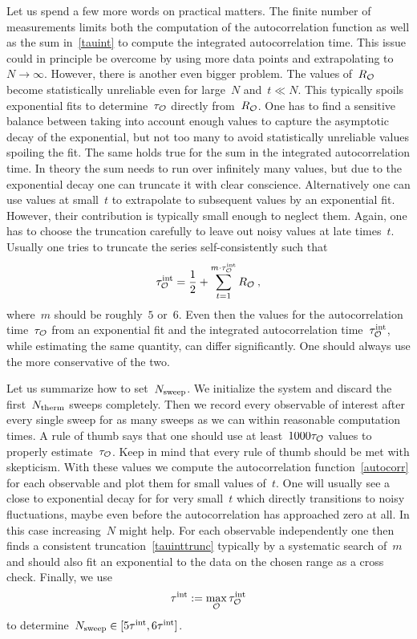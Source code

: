 Let us spend a few more words on practical matters. The finite number of
measurements limits both the computation of the autocorrelation function as well
as the sum in~\eqref{tauint} to compute the integrated autocorrelation time.
This issue could in principle be overcome by using more data points and
extrapolating to~$N\to \infty$. However, there is another even bigger problem.
The values of~$R_{\mathcal{O}}$ become statistically unreliable even for large~$N$
and~$t\ll N$. This typically spoils exponential fits to determine~$\tau_{\mathcal{O}}$
directly from~$R_{\mathcal{O}}$. One has to find a sensitive balance between taking into
account enough values to capture the asymptotic decay of the exponential, but
not too many to avoid statistically unreliable values spoiling the fit. The same
holds true for the sum in the integrated autocorrelation time. In theory the sum
needs to run over infinitely many values, but due to the exponential decay one
can truncate it with clear conscience. Alternatively one can use values at
small~$t$ to extrapolate to subsequent values by an exponential fit. However,
their contribution is typically small enough to neglect them. Again, one has to
choose the truncation carefully to leave out noisy values at late times~$t$.
Usually one tries to truncate the series self-consistently such that
%
\begin{equation}\label{tauinttrunc}
  \tau^{\mathrm{int}}_{\mathcal{O}} = \frac{1}{2} + \sum_{t=1}^{m \cdot \tau^{\mathrm{int}}_{\mathcal{O}}} R_{\mathcal{O}}\:,
\end{equation}
%
where~$m$ should be roughly~$5$ or~$6$. Even then the values for the
autocorrelation time~$\tau_{\mathcal{O}}$ from an exponential fit and the integrated
autocorrelation time~$\tau^{\mathrm{int}}_{\mathcal{O}}$, while estimating the same quantity, can
differ significantly. One should always use the more conservative of the two.

Let us summarize how to set~$N_{\mathrm{sweep}}$. We initialize the system and discard the
first~$N_{\mathrm{therm}}$ sweeps completely. Then we record every observable of interest
after every single sweep for as many sweeps as we can within reasonable
computation times. A rule of thumb says that one should use at least~$1000
\tau_{\mathcal{O}}$ values to properly estimate~$\tau_{\mathcal{O}}$. Keep in mind that every
rule of thumb should be met with skepticism. With these values we compute the
autocorrelation function~\eqref{autocorr} for each observable and plot them for
small values of~$t$. One will usually see a close to exponential decay for for
very small~$t$ which directly transitions to noisy fluctuations, maybe even
before the autocorrelation has approached zero at all. In this case
increasing~$N$ might help. For each observable independently one then finds a
consistent truncation~\eqref{tauinttrunc} typically by a systematic search
of~$m$ and should also fit an exponential to the data on the chosen range as a
cross check. Finally, we use
%
\begin{equation}
  \tau^{\mathrm{int}} := \max_{\mathcal{O}} \tau^{\mathrm{int}}_{\mathcal{O}}
\end{equation}
%
to determine~$N_{\mathrm{sweep}} \in [5 \tau^{\mathrm{int}}, 6 \tau^{\mathrm{int}}]$.

